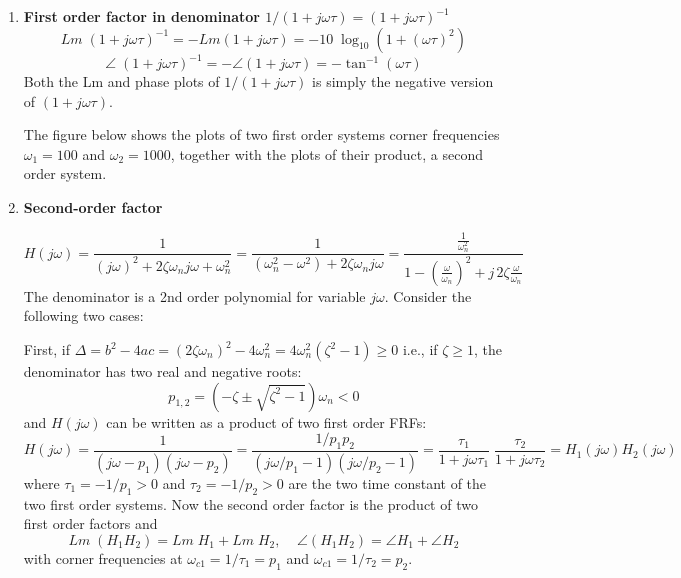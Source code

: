 \documentclass{article}
\begin{document}
\begin{enumerate}
\item {\bf First order factor in denominator $1/(1+j\omega\tau)=(1+j\omega\tau)^{-1}$}
  \begin{equation} 
    Lm\;(1+j\omega\tau)^{-1}=-Lm(1+j\omega\tau)
    =-10\;\log_{10}(1+(\omega \tau)^2) 
  \end{equation}
  \begin{equation} 
    \angle\;(1+j\omega \tau)^{-1}=-\angle(1+j\omega \tau)
    =-\tan^{-1}(\omega\tau) 
  \end{equation}
  Both the Lm and phase plots of $1/(1+j\omega\tau)$ is simply the negative 
  version of $(1+j\omega\tau)$. 

  The figure below shows the plots of two first order systems corner frequencies 
  $\omega_1=100$ and $\omega_2=1000$, together with the plots of their product, a 
  second order system.


\item {\bf Second-order factor}

  \begin{equation} 
    H(j\omega)=\frac{1}{(j\omega)^2+2\zeta\omega_n j\omega+\omega_n^2}
    =\frac{1}{(\omega^2_n-\omega^2)+2\zeta\omega_n j\omega}
    =\frac{\frac{1}{\omega_n^2}}{1-(\frac{\omega}{\omega_n})^2+j\,2\zeta\frac{\omega}{\omega_n}}
  \end{equation}
  The denominator is a 2nd order polynomial for variable $j\omega$. Consider the
  following two cases:

  First, if $\Delta=b^2-4ac=(2\zeta\omega_n)^2-4\omega_n^2=4\omega^2_n(\zeta^2-1)\ge 0$
  i.e., if $\zeta\ge 1$, the denominator has two real and negative roots:
  \begin{equation} 
    p_{1,2}=(-\zeta\pm\sqrt{\zeta^2-1})\omega_n < 0 
  \end{equation}
  and $H(j\omega)$ can be written as a product of two first order FRFs:
  \begin{equation}
    H(j\omega)=\frac{1}{(j\omega-p_1)(j\omega-p_2)} 
    =\frac{1/p_1p_2}{(j\omega/p_1-1)(j\omega/p_2-1)} 
    =\frac{\tau_1}{1+j\omega\tau_1}\;\frac{\tau_2}{1+j\omega\tau_2}
    =H_1(j\omega)H_2(j\omega) 
  \end{equation}
  where $\tau_1=-1/p_1>0$ and $\tau_2=-1/p_2>0$ are the two time constant of the two
  first order systems. Now the second order factor is the product of two first order 
  factors and
  \begin{equation}
    Lm\;(H_1 H_2)=Lm\; H_1+Lm\; H_2,\;\;\;\;\angle (H_1 H_2)=\angle H_1+\angle H_2 
  \end{equation}
  with corner frequencies at $\omega_{c1}=1/\tau_1=p_1$ and $\omega_{c1}=1/\tau_2=p_2$.


\end{enumerate}
\end{document}

